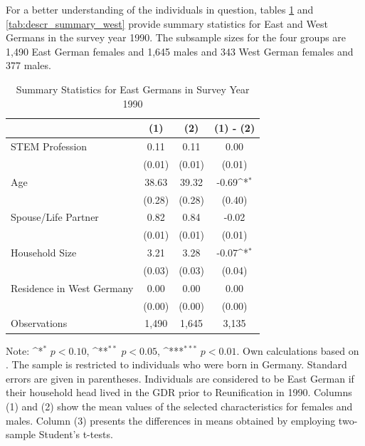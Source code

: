 \documentclass[a4paper, oneside, hyperfootnotes = false]{article}
\def\sym#1{\ifmmode^{#1}\else\(^{#1}\)\fi}
\begin{document}
{For a better understanding of the individuals in question, tables \ref{tab:descr_summary_east} and \ref{tab:descr_summary_west} provide summary statistics for East and West Germans in the survey year 1990.
The subsample sizes for the four groups are 1,490 East German females and 1,645 males and 343 West German females and 377 males.

\begin{table}[ht]
	\caption{Summary Statistics for East Germans in Survey Year 1990}
	\label{tab:descr_summary_east}
	\begin{center}
		\begin{tabular}{l*{3}{c}}
			\toprule
			& (1) & (2) & (1) - (2) \\
			\midrule
			STEM Profession & 0.11  & 0.11  &   0.00     \\
			&   (0.01)  & (0.01) & (0.01) \\
			\addlinespace
			Age         &   38.63   &  39.32  &  -0.69\sym{*}     \\
			&     (0.28) &        (0.28)         &      (0.40) \\
			\addlinespace
			Spouse/Life Partner &  0.82      &  0.84  &    -0.02    \\
			&      (0.01)&          (0.01)&         (0.01) \\
			\addlinespace
			Household Size      &  3.21   &  3.28   &   -0.07\sym{*}       \\
			&          (0.03)&       (0.03)        &      (0.04)\\
			\addlinespace
			Residence in West Germany&  0.00   &   0.00  &  0.00         \\
			&         (0.00) &       (0.00)&  (0.00)\\
			\midrule
			Observations        &  1,490    &    1,645     &      3,135             \\
			\bottomrule
		\end{tabular}
		
		\vspace{2mm}
		
		\parbox{10cm}{
			\linespread{1}\footnotesize Note: \sym{*} \(p<0.10\), \sym{**} \(p<0.05\), \sym{***} \(p<0.01\). Own calculations based on \cite{SOEP2023}. The sample is restricted to individuals who were born in Germany. Standard errors are given in parentheses. Individuals are considered to be East German if their household head lived in the GDR prior to Reunification in 1990. Columns (1) and (2) show the mean values of the selected characteristics for females and males. Column (3) presents the differences in means obtained by employing two-sample Student's t-tests.}
		

\end{center}
\end{table}}
\end{document}
